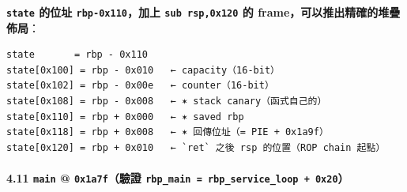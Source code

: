 \documentclass[10pt,a4paper]{article}
\begin{document}
\textbf{\texttt{state} 的位址 \texttt{rbp-\allowbreak{}0x110}，加上
\texttt{sub\ \allowbreak{}rsp,\allowbreak{}0x120} 的 frame，可以推出精確的堆疊佈局}：

\begin{Verbatim}[breaklines=true,breakanywhere=true,breakautoindent=false,fontsize=\fontsize{7.0}{9.5}\selectfont]
state       = rbp - 0x110
state[0x100] = rbp - 0x010   ← capacity（16-bit）
state[0x102] = rbp - 0x00e   ← counter（16-bit）
state[0x108] = rbp - 0x008   ← ✶ stack canary（函式自己的）
state[0x110] = rbp + 0x000   ← ✶ saved rbp
state[0x118] = rbp + 0x008   ← ✶ 回傳位址（= PIE + 0x1a9f）
state[0x120] = rbp + 0x010   ← `ret` 之後 rsp 的位置（ROP chain 起點）
\end{Verbatim}

\paragraph{\texorpdfstring{4.11 \texttt{main} @ \texttt{0x1a7f}（驗證
\texttt{rbp\_\allowbreak{}main\ \allowbreak{}=\ \allowbreak{}rbp\_\allowbreak{}service\_\allowbreak{}loop\ \allowbreak{}+\ \allowbreak{}0x20}）}{4.11 main @ 0x1a7f（驗證 rbp\_main = rbp\_service\_loop + 0x20）}}\label{main-0x1a7fux9a57ux8b49-rbp_main-rbp_service_loop-0x20}
\end{document}
